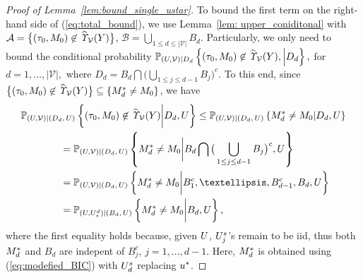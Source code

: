 \documentclass[10pt,a4paper]{amsart}
\def\P{\mathbb P}
\begin{document}
\begin{proof}[Proof of Lemma~\ref{lem:bound_single_ustar}]
To bound the first term on the right-hand side of (\ref{eq:total_bound}), we use Lemma~\ref{lem: upper_coniditonal} with 
${\mathcal A} =\big\{ (\tau_0, \*M_0) \not\in \widehat{\it \Upsilon}_{{\mathcal V}}(\*Y)\big\}$, ${\mathcal B} = \bigcup_{1 \leq d \leq |\mathcal V|}B_d$. Particularly, we only need to bound the conditional probability 
$\P_{(\*U,\mathcal V) | D_d}\left\{(\tau_0, \*M_0) \not\in \widehat{\it \Upsilon}_{{\mathcal V}}(\*Y), \middle | D_d 
\right\},$ 
for $d =1, \dots, |\mathcal V|,$ where $D_d = B_d \bigcap\big(\bigcup_{1\leq j \leq d-1} B_j\big)^c$.
To this end, since 
$\big\{(\tau_0, \*M_0) \not\in \widehat{\it \Upsilon}_{{\mathcal V}}(\*Y)\big\} \subseteq \{\*M^*_{d}  \neq \*M_0  \}
$, we have 
\begin{align*}
    & \P_{(\*U,\mathcal V) | (D_d, \, \*U)}\left\{(\tau_0, \*M_0) \not\in \widehat{\it \Upsilon}_{{\mathcal V}}(\*Y) \bigg| D_d,  \*U\right\} \leq \P_{(\*U,\mathcal V) | (D_d, \, \*U)}\left\{ \*M^*_{d}  \neq \*M_0  |  D_d,  \*U\right\} \\
    & \qquad\qquad = 
    \P_{(\*U,\mathcal V) | (D_d, \, \*U)}\left\{ \*M^*_{d}  \neq \*M_0  \bigg| B_d \bigcap\big(\bigcup_{1\leq j \leq d-1} B_j\big)^c,  \*U\right\}
    \\
    & \qquad\qquad = 
    \P_{(\*U,\mathcal V) | (D_d, \, \*U)}\left\{ \*M^*_{d}  \neq \*M_0  \bigg| B_1^c, \ldots, B_{d-1}^c, B_d,  \*U\right\}  \\ & \qquad\qquad = 
    \P_{(\*U,\*U_s^d) | (B_d, \, \*U)}\left\{ \*M^*_{d}  \neq \*M_0  \bigg| B_d,  \*U\right\},
\end{align*}
 where the first equality holds because, given $\*U$, $\*U^s_j$'s remain to be iid, thus both $\*M^*_{d}$ and $B_d$ are indepent of $B_j^c$, $j =1, \ldots, d-1$.
Here, 
$\*M^*_{d}$ is obtained using (\ref{eq:modefied_BIC}) with 
 $\*U_d^s$ replacing $\*u^*$.




\end{proof}
\end{document}

